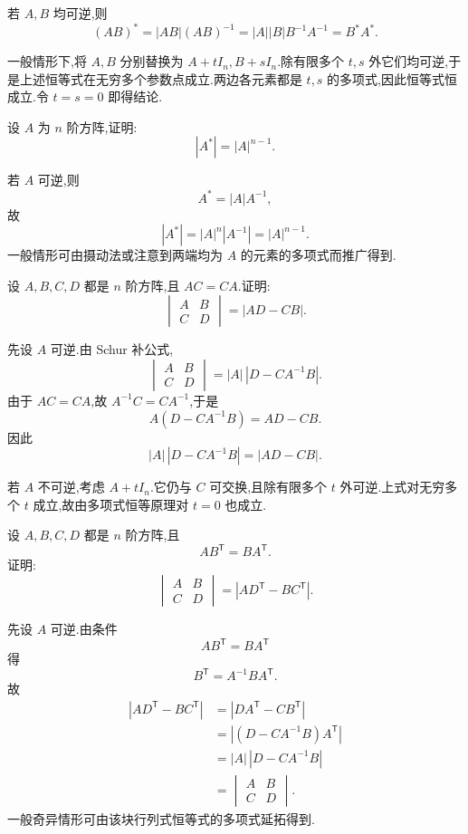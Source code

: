 \begin{solution}
若 $A,B$ 均可逆,则
\[
(AB)^*
=|AB|(AB)^{-1}
=|A||B|B^{-1}A^{-1}
=B^*A^*.
\]

一般情形下,将 $A,B$ 分别替换为 $A+tI_n,B+sI_n$.除有限多个 $t,s$ 外它们均可逆,于是上述恒等式在无穷多个参数点成立.两边各元素都是 $t,s$ 的多项式,因此恒等式恒成立.令 $t=s=0$ 即得结论.
\end{solution}

\begin{example}
设 $A$ 为 $n$ 阶方阵,证明:
\[
|A^*|=|A|^{n-1}.
\]
\end{example}
\exampleblank

\begin{solution}
若 $A$ 可逆,则
\[
A^*=|A|A^{-1},
\]
故
\[
|A^*|
=|A|^n|A^{-1}|
=|A|^{n-1}.
\]
一般情形可由摄动法或注意到两端均为 $A$ 的元素的多项式而推广得到.
\end{solution}

\begin{example}
设 $A,B,C,D$ 都是 $n$ 阶方阵,且 $AC=CA$.证明:
\[
\begin{vmatrix}
A&B\\C&D
\end{vmatrix}
=|AD-CB|.
\]
\end{example}
\exampleblank

\begin{solution}
先设 $A$ 可逆.由 Schur 补公式,
\[
\begin{vmatrix}A&B\\C&D\end{vmatrix}
=|A|\,|D-CA^{-1}B|.
\]
由于 $AC=CA$,故 $A^{-1}C=CA^{-1}$,于是
\[
A(D-CA^{-1}B)=AD-CB.
\]
因此
\[
|A|\,|D-CA^{-1}B|=|AD-CB|.
\]

若 $A$ 不可逆,考虑 $A+tI_n$.它仍与 $C$ 可交换,且除有限多个 $t$ 外可逆.上式对无穷多个 $t$ 成立,故由多项式恒等原理对 $t=0$ 也成立.
\end{solution}

\begin{example}
设 $A,B,C,D$ 都是 $n$ 阶方阵,且
\[
AB^{\mathsf T}=BA^{\mathsf T}.
\]
证明:
\[
\begin{vmatrix}
A&B\\C&D
\end{vmatrix}
=|AD^{\mathsf T}-BC^{\mathsf T}|.
\]
\end{example}
\exampleblank

\begin{solution}
先设 $A$ 可逆.由条件
\[
AB^{\mathsf T}=BA^{\mathsf T}
\]
得
\[
B^{\mathsf T}=A^{-1}BA^{\mathsf T}.
\]
故
\[
\begin{aligned}
|AD^{\mathsf T}-BC^{\mathsf T}|
&=|DA^{\mathsf T}-CB^{\mathsf T}|\\
&=|(D-CA^{-1}B)A^{\mathsf T}|\\
&=|A|\,|D-CA^{-1}B|\\
&=
\begin{vmatrix}A&B\\C&D\end{vmatrix}.
\end{aligned}
\]
一般奇异情形可由该块行列式恒等式的多项式延拓得到.
\end{solution}

